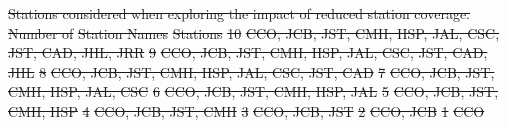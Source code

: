 \documentclass[12pt,double]{article}
\providecommand{\DIFdel}[1]{{\protect\color{red}\sout{#1}}}                      %
\providecommand{\DIFdelbegin}{} %
\providecommand{\DIFdelend}{} %
\begin{document}
\DIFdelbegin %

{%
\DIFdel{Stations considered when exploring the impact of reduced
station coverage.}} %
\DIFdel{Number of }%
\DIFdel{Station Names}%
\DIFdel{Stations  }%
\DIFdel{10 }%
\DIFdel{CCO, JCB, JST, CMH, HSP, JAL, CSC, JST, CAD, JHL, JRR}%
\DIFdel{9  }%
\DIFdel{CCO, JCB, JST, CMH, HSP, JAL, CSC, JST, CAD, JHL}%
\DIFdel{8  }%
\DIFdel{CCO, JCB, JST, CMH, HSP, JAL, CSC, JST, CAD}%
\DIFdel{7  }%
\DIFdel{CCO, JCB, JST, CMH, HSP, JAL, CSC }%
\DIFdel{6  }%
\DIFdel{CCO, JCB, JST, CMH, HSP, JAL }%
\DIFdel{5  }%
\DIFdel{CCO, JCB, JST, CMH, HSP }%
\DIFdel{4  }%
\DIFdel{CCO, JCB, JST, CMH }%
\DIFdel{3  }%
\DIFdel{CCO, JCB, JST }%
\DIFdel{2  }%
\DIFdel{CCO, JCB }%
\DIFdel{1  }%
\DIFdel{CCO }%

\DIFdelend \clearpage

\end{document}
